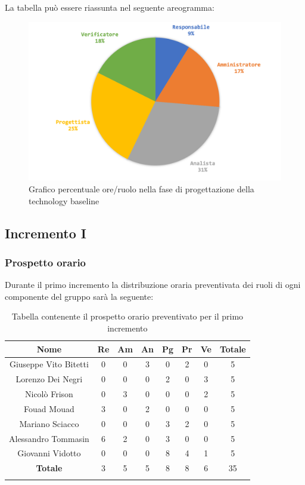 		La tabella può essere riassunta nel seguente areogramma:
		\begin{figure}[H]
			\centering
			\includegraphics[width=0.8\linewidth]{./images/preventivo/progArch2.png}
			\caption{Grafico percentuale ore/ruolo nella fase di progettazione della technology baseline}
			\label{fig:grafico costi ruolo fase progettazione della technology baseline}
		\end{figure}
	
	
	\subsection{Incremento I}
		\subsubsection{Prospetto orario}
		Durante il primo incremento la distribuzione oraria preventivata dei ruoli di ogni componente del gruppo sarà la seguente:
		
		\begin{longtable}{|c|c|c|c|c|c|c|c|}
			\hline
			\rowcolor{lighter-grayer}
			\textbf{Nome} & \textbf{Re} & \textbf{Am} & \textbf{An} & \textbf{Pg}  & \textbf{Pr}   & \textbf{Ve} & \textbf{Totale} \\
			\hline
			\endfirsthead
			
			\hline
			Giuseppe Vito Bitetti 		 & 0 & 0 & 3 & 0 & 2 & 0 & 5\\
			\hline
			\hline
			Lorenzo Dei Negri			 & 0 & 0 & 0 & 2 & 0 & 3 & 5\\
			\hline
			\hline
			Nicolò Frison				    & 0 & 3 & 0 & 0 & 0 & 2 & 5\\
			\hline
			\hline
			Fouad Mouad 				 & 3 & 0 & 2 & 0 & 0 & 0 & 5\\
			\hline
			\hline
			Mariano Sciacco 			 & 0 & 0 & 0 & 3 & 2 & 0 & 5\\
			\hline
			\hline
			Alessandro Tommasin     & 6 & 2 & 0 & 3 & 0 & 0 & 5\\
			\hline
			\hline
			Giovanni Vidotto 			 & 0 & 0 & 0 & 8 & 4 & 1 & 5\\
			\hline 
			\textbf{Totale}			 		& 3 & 5 & 5 & 8 & 8 & 6 & 35\\
			\hline
			\caption{Tabella contenente il prospetto orario preventivato per il primo incremento}
		\end{longtable}
		\pagebreak
		
